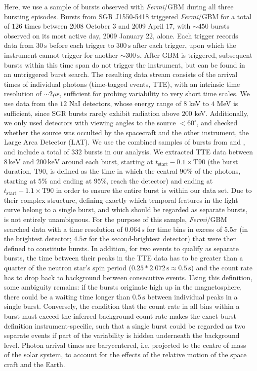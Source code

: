 \documentclass[12pt]{emulateapj}
\newcommand{\project}[1]{\textsl{#1}}
\newcommand{\fermi}{\project{Fermi}}
\begin{document}
Here, we use a sample of bursts observed with {\it Fermi}/GBM during all three bursting episodes. Bursts from SGR J1550-5418 triggered \fermi/GBM for a total of $126$ 
times between 2008 October 3 and 2009 April 17, with $\sim 450$ bursts observed on its most active day, 2009 January 22, alone. 
Each trigger records data from $30\,\mathrm{s}$ before each trigger to $300\,\mathrm{s}$ after each trigger, upon which the instrument cannot trigger for another $\sim 300 \,\mathrm{s}$. 
After GBM is triggered, subsequent bursts within this time span do not trigger the instrument, but can be found in an untriggered burst search. The resulting data stream consists of 
the arrival times of individual photons (time-tagged events, TTE), with an intrinsic time resolution of $\sim 2\mu\mathrm{s}$, sufficient for probing variability to very short time scales.
We use data from the $12$ NaI detectors, whose energy range of $8$ keV to $4$ MeV is sufficient, since SGR bursts rarely exhibit radiation above $200$ keV. Additionally, we only used detectors with viewing angles to the source $< 60^{\circ}$, and checked whether the source was occulted by the spacecraft and the other instrument, the Large Area Detector (LAT). We use the combined samples of bursts from \citet{vonkienlin2012} and \citet{vanderhorst2012}, and include a total of $332$ bursts in our analysis.
We extracted TTE data between $8 \, \mathrm{keV}$ and $200 \, \mathrm{keV}$ around each burst, starting at $t_{\mathrm{start}} - 0.1 \times\mathrm{T}90$ (the burst duration, $\mathrm{T}90$, is defined as the time in which the central $90\%$ of the photons, starting at $5\%$ and ending at $95\%$, reach the detector) and ending at $t_{\mathrm{start}} + 1.1\times\mathrm{T}90$ in order to ensure the entire burst is within our data set. Due to their complex structure, defining exactly which temporal features in the light curve belong to a single burst, and which should be regarded as separate bursts, is 
not entirely unambiguous. For the purpose of this sample, \citet{vanderhorst2012} \fermi/GBM searched data with a time resolution of $0.064\,\mathrm{s}$ for time bins in excess of $5.5\sigma$ 
(in the brightest detector; $4.5\sigma$ for the second-brightest detector) that were then defined to constitute bursts. In addition, for two events to qualify as separate bursts, the time between their peaks
in the TTE data has to be greater than a quarter of the neutron star's spin period ($0.25*2.072\,\mathrm{s} \approx 0.5\,\mathrm{s}$) 
and the count rate has to drop back to background between consecutive events. 
Using this definition, some ambiguity remains: if the bursts originate high up in the magnetosphere, there could be a waiting 
time longer than $0.5\,\mathrm{s}$ between individual peaks in a single burst. Conversely, the condition that the count rate in all bins within a burst must
exceed the inferred background count rate makes the exact burst definition instrument-specific, such that a single burst could be regarded as two separate events
if part of the variability is hidden underneath the background level.
Photon arrival times are barycentered, i.e. projected to the centre of mass of the solar system, to account for the effects of the relative motion of the space craft and the Earth.
\end{document}
